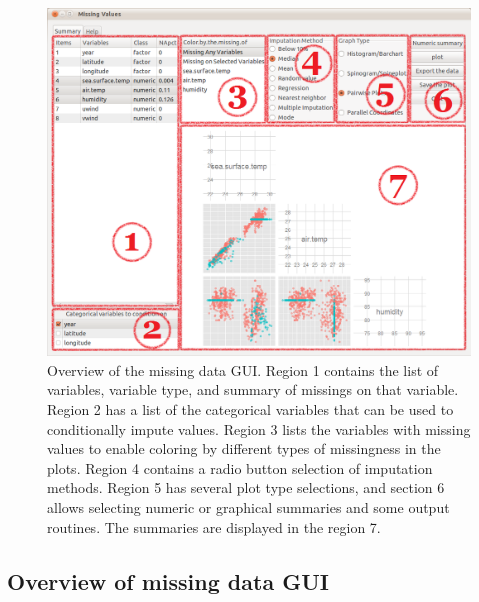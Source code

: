 \documentclass[english]{article}
\begin{document}
\begin{center}
%
\begin{figure}[h]
\begin{centering}
\includegraphics[width=.9\textwidth]{fig1-1-0}
\par\end{centering}

\caption{Overview of the missing data GUI. Region 1 contains the list of variables, variable type, and summary of missings on that variable. Region 2 has a list of the categorical variables that can be used to conditionally impute values. Region 3 lists the variables with missing values to enable coloring by different types of missingness in the plots. Region 4 contains a radio button selection of imputation methods. Region 5 has several plot type selections, and section 6 allows selecting numeric or graphical summaries and some output routines. The summaries are displayed in the region 7.}
\label{fig: missingGUI}
\end{figure}

\par\end{center}


\subsection{Overview of missing data GUI}
\end{document}
